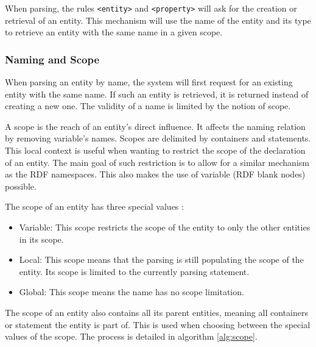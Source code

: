 \documentclass[11pt,a4paper,twoside,openright,titlepage,numbers=noenddot,headinclude,cleardoublepage=empty,openany]{scrreprt}
\theoremstyle{plain}
\theoremstyle{definition}
\theoremstyle{remark}
\newcommand{\passthrough}[1]{#1}
\providecommand{\tightlist}{%
  \setlength{\itemsep}{0pt}\setlength{\parskip}{0pt}}
\begin{document}
When parsing, the rules \passthrough{\lstinline!<entity>!} and
\passthrough{\lstinline!<property>!} will ask for the creation or
retrieval of an entity. This mechanism will use the name of the entity
and its type to retrieve an entity with the same name in a given scope.

\hypertarget{naming-and-scope}{%
\subsubsection{Naming and Scope}\label{naming-and-scope}}

When parsing an entity by name, the system will first request for an
existing entity with the same name. If such an entity is retrieved, it
is returned instead of creating a new one. The validity of a name is
limited by the notion of scope.

A scope is the reach of an entity's direct influence. It affects the
naming relation by removing variable's names. Scopes are delimited by
containers and statements. This local context is useful when wanting to
restrict the scope of the declaration of an entity. The main goal of
such restriction is to allow for a similar mechanism as the RDF
namespaces. This also makes the use of variable (RDF blank nodes)
possible.

The scope of an entity has three special values :

\begin{itemize}
\tightlist
\item
  Variable: This scope restricts the scope of the entity to only the
  other entities in its scope.
\item
  Local: This scope means that the parsing is still populating the scope
  of the entity. Its scope is limited to the currently parsing
  statement.
\item
  Global: This scope means the name has no scope limitation.
\end{itemize}

The scope of an entity also contains all its parent entities, meaning
all containers or statement the entity is part of. This is used when
choosing between the special values of the scope. The process is
detailed in algorithm \ref{alg:scope}.
\end{document}
